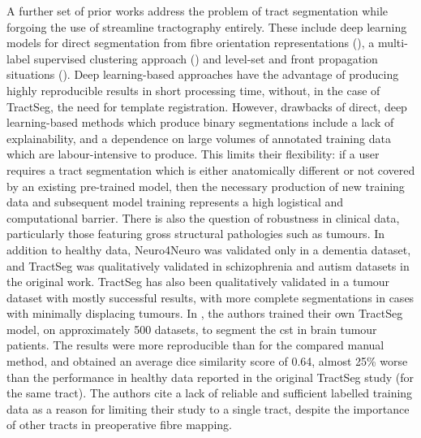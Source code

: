 A further set of prior works address the problem of tract segmentation while forgoing the use of streamline tractography entirely.
These include deep learning models for direct segmentation from fibre orientation representations (\textcite{Li2020, Wasserthal2018}), a multi-label supervised clustering approach (\textcite{Ratnarajah2014}) and level-set and front propagation situations (\textcite{Nazem-Zadeh2011, Hao2014}).
Deep learning-based approaches have the advantage of producing highly reproducible results in short processing time, without, in the case of TractSeg, the need for template registration.
However, drawbacks of direct, deep learning-based methods which produce binary segmentations include a lack of explainability, and a dependence on large volumes of annotated training data which are labour-intensive to produce.
This limits their flexibility: if a user requires a tract segmentation which is either anatomically different or not covered by an existing pre-trained model, then the necessary production of new training data and subsequent model training represents a high logistical and computational barrier.
There is also the question of robustness in clinical data, particularly those featuring gross structural pathologies such as tumours.
In addition to healthy data, Neuro4Neuro\textcite{Li2020} was validated only in a dementia dataset, and TractSeg\autocite{Wasserthal2018} was qualitatively validated in schizophrenia and autism datasets in the original work.
TractSeg has also been qualitatively validated in a tumour dataset with mostly successful results, with more complete segmentations in cases with minimally displacing tumours.\autocite{Richards2021}
In \textcite{Moshe2022}, the authors trained their own TractSeg model, on approximately 500 datasets, to segment the \gls{cst} in brain tumour patients.
The results were more reproducible than for the compared manual method, and obtained an average dice similarity score of 0.64, almost 25\% worse than the performance in healthy data reported in the original TractSeg study (for the same tract).
The authors cite a lack of reliable and sufficient labelled training data as a reason for limiting their study to a single tract, despite the importance of other tracts in preoperative fibre mapping.


